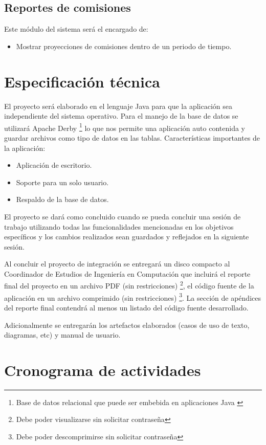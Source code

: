 \subsection*{Reportes de comisiones}

Este m\'odulo del sistema ser\'a el encargado de:
\begin{itemize}
	\item Mostrar proyecciones de comisiones dentro de un periodo de tiempo.
\end{itemize}

\section{Especificación técnica}
El proyecto ser\'a elaborado en el lenguaje Java para que la aplicación sea independiente del sistema operativo. Para el manejo de la base de datos se utilizará Apache Derby \footnote{Base de datos relacional que puede ser embebida en aplicaciones Java \cite{www:derby}} lo que nos permite una aplicación auto contenida y guardar archivos como tipo de datos en las tablas.
Características importantes de la aplicación:
\begin{itemize}
	\item Aplicación de escritorio.
	\item Soporte para un solo usuario.
	\item Respaldo de la base de datos.
\end{itemize}

El proyecto se dará como concluido cuando se pueda concluir una sesión de trabajo utilizando todas las funcionalidades mencionadas en los objetivos específicos y los cambios realizados sean guardados y reflejados en la siguiente sesión.

Al concluir el proyecto de integración se entregará un disco compacto al Coordinador
de Estudios de Ingeniería en Computación que incluirá el reporte final del proyecto
en un archivo PDF (sin restricciones) \footnote{Debe poder visualizarse sin solicitar contraseña}, el código fuente de la aplicación en un archivo comprimido (sin restricciones) \footnote{Debe poder descomprimirse sin solicitar contraseña}. La sección de apéndices del reporte final contendrá al menos un listado del código fuente desarrollado.

Adicionalmente se entregar\'an los artefactos elaborados (casos de uso de texto, diagramas, etc) y manual de usuario.

\section{Cronograma de actividades}

